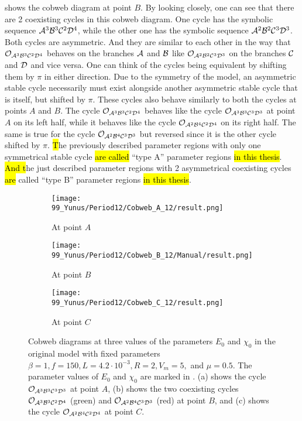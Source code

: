  shows the cobweb diagram at point $B$.
By looking closely, one can see that there are 2 coexisting cycles in this cobweb diagram.
One cycle has the symbolic sequence $\mathcal{A}^3\mathcal{B}^3\mathcal{C}^2\mathcal{D}^4$, while the other one has the symbolic sequence $\mathcal{A}^2\mathcal{B}^2\mathcal{C}^3\mathcal{D}^3$.
Both cycles are asymmetric.
And they are similar to each other in the way that $\mathcal{O}_{\mathcal{A}^3\mathcal{B}^3\mathcal{C}^2\mathcal{D}^4}$ behaves on the branches $\mathcal{A}$ and $\mathcal{B}$ like $\mathcal{O}_{\mathcal{A}^2\mathcal{B}^2\mathcal{C}^3\mathcal{D}^3}$ on the branches $\mathcal{C}$ and $\mathcal{D}$ and vice versa.
One can think of the cycles being equivalent by shifting them by $\pi$ in either direction.
Due to the symmetry of the model, an asymmetric stable cycle necessarily must exist alongside another asymmetric stable cycle that is itself, but shifted by $\pi$.
These cycles also behave similarly to both the cycles at points $A$ and $B$.
The cycle $\mathcal{O}_{\mathcal{A}^3\mathcal{B}^3\mathcal{C}^2\mathcal{D}^4}$ behaves like the cycle $\mathcal{O}_{\mathcal{A}^3\mathcal{B}^3\mathcal{C}^3\mathcal{D}^3}$ at point $A$ on its left half, while it behaves like the cycle $\mathcal{O}_{\mathcal{A}^2\mathcal{B}^4\mathcal{C}^2\mathcal{D}^4}$ on its right half.
The same is true for the cycle $\mathcal{O}_{\mathcal{A}^2\mathcal{B}^4\mathcal{C}^3\mathcal{D}^3}$ but reversed since it is the other cycle shifted by $\pi$.
\hl{T}he previously described parameter regions with only one symmetrical stable cycle \hl{are called} ``type A'' parameter regions \hl{in this thesis}.
\hl{And t}he just described parameter regions with 2 asymmetrical coexisting cycles \hl{are} called ``type B'' parameter regions \hl{in this thesis}.

\begin{figure}
	\centering
	\begin{subfigure}{0.3\textwidth}
		\centering
		\texttt{[image: 99\_Yunus/Period12/Cobweb\_A\_12/result.png]}
		\caption{At point $A$}
		\label{fig:state.og.dynamics.cobweb.A}
	\end{subfigure}
	\begin{subfigure}{0.3\textwidth}
		\centering
		\texttt{[image: 99\_Yunus/Period12/Cobweb\_B\_12/Manual/result.png]}
		\caption{At point $B$}
		\label{fig:state.og.dynamics.cobweb.B}
	\end{subfigure}
	\begin{subfigure}{0.3\textwidth}
		\centering
		\texttt{[image: 99\_Yunus/Period12/Cobweb\_C\_12/result.png]}
		\caption{At point $C$}
		\label{fig:state.og.dynamics.cobweb.C}
	\end{subfigure}
	\caption[Cobweb diagrams of the original model]{
		Cobweb diagrams at three values of the parameters $E_0$ and $\chi_0$ in the original model with fixed parameters $\beta = 1, f = 150, L = 4.2 \cdot 10^{-3}, R = 2, V_m = 5,$ and $\mu = 0.5$.
		The parameter values of $E_0$ and $\chi_0$ are marked in .
		(a) shows the cycle $\mathcal{O}_{\mathcal{A}^3\mathcal{B}^3\mathcal{C}^3\mathcal{D}^3}$ at point $A$, (b) shows the two coexisting cycles $\mathcal{O}_{\mathcal{A}^3\mathcal{B}^3\mathcal{C}^2\mathcal{D}^4}$ (green) and $\mathcal{O}_{\mathcal{A}^2\mathcal{B}^4\mathcal{C}^3\mathcal{D}^3}$ (red) at point $B$, and (c) shows the cycle $\mathcal{O}_{\mathcal{A}^2\mathcal{B}^4\mathcal{C}^2\mathcal{D}^4}$ at point $C$.
	}
	\label{fig:state.og.dynamics.cobwebs}
\end{figure}

